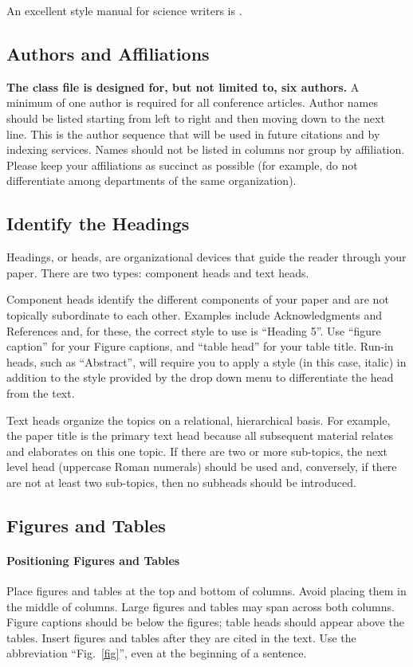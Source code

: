 \documentclass[conference]{IEEEtran}
\begin{document}
An excellent style manual for science writers is \cite{b7}.

\subsection{Authors and Affiliations}
\textbf{The class file is designed for, but not limited to, six authors.} A
minimum of one author is required for all conference articles. Author names
should be listed starting from left to right and then moving down to the next
line. This is the author sequence that will be used in future citations and by
indexing services. Names should not be listed in columns nor group by
affiliation. Please keep your affiliations as succinct as possible (for
example, do not differentiate among departments of the same organization).

\subsection{Identify the Headings}
Headings, or heads, are organizational devices that guide the reader through
your paper. There are two types: component heads and text heads.

Component heads identify the different components of your paper and are not
topically subordinate to each other. Examples include Acknowledgments and
References and, for these, the correct style to use is ``Heading 5''. Use
``figure caption'' for your Figure captions, and ``table head'' for your table
title. Run-in heads, such as ``Abstract'', will require you to apply a style
(in this case, italic) in addition to the style provided by the drop down menu
to differentiate the head from the text.

Text heads organize the topics on a relational, hierarchical basis. For
example, the paper title is the primary text head because all subsequent
material relates and elaborates on this one topic. If there are two or more
sub-topics, the next level head (uppercase Roman numerals) should be used and,
conversely, if there are not at least two sub-topics, then no subheads should
be introduced.

\subsection{Figures and Tables}
\paragraph{Positioning Figures and Tables} Place figures and tables at the top and
bottom of columns. Avoid placing them in the middle of columns. Large figures
and tables may span across both columns. Figure captions should be below the
figures; table heads should appear above the tables. Insert figures and tables
after they are cited in the text. Use the abbreviation
``Fig.~\ref{fig}'', even at the beginning of a sentence.
\end{document}
